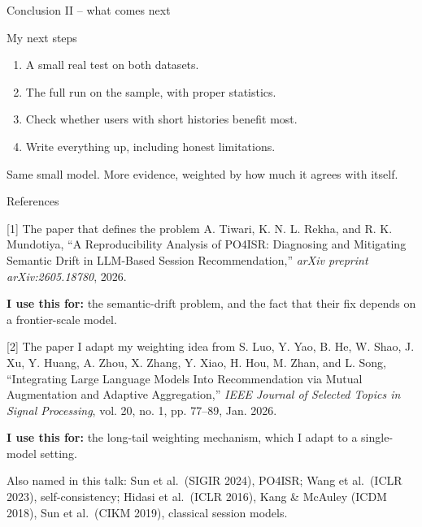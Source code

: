 \documentclass[aspectratio=169,12pt]{beamer}
\begin{document}
\begin{frame}{Conclusion II -- what comes next}
\begin{block}{My next steps}
\begin{enumerate}
  \item A small real test on both datasets.
  \item The full run on the sample, with proper statistics.
  \item Check whether users with short histories benefit most.
  \item Write everything up, including honest limitations.
\end{enumerate}
\end{block}

\vspace{1em}
\centering
\Large\textcolor{DeepBlue}{Same small model. More evidence, weighted by how much it agrees with itself.}
\end{frame}

\begin{frame}{References}
\small
\begin{block}{[1] The paper that defines the problem}
A. Tiwari, K. N. L. Rekha, and R. K. Mundotiya, ``A Reproducibility
Analysis of PO4ISR: Diagnosing and Mitigating Semantic Drift in LLM-Based
Session Recommendation,'' \emph{arXiv preprint arXiv:2605.18780}, 2026.
\vspace{0.2em}
\par\textcolor{Muted}{\footnotesize \textbf{I use this for:} the semantic-drift
problem, and the fact that their fix depends on a frontier-scale model.}
\end{block}

\vspace{0.4em}
\begin{block}{[2] The paper I adapt my weighting idea from}
S. Luo, Y. Yao, B. He, W. Shao, J. Xu, Y. Huang, A. Zhou, X. Zhang,
Y. Xiao, H. Hou, M. Zhan, and L. Song, ``Integrating Large Language Models
Into Recommendation via Mutual Augmentation and Adaptive Aggregation,''
\emph{IEEE Journal of Selected Topics in Signal Processing}, vol. 20,
no. 1, pp. 77--89, Jan. 2026.
\vspace{0.2em}
\par\textcolor{Muted}{\footnotesize \textbf{I use this for:} the long-tail
weighting mechanism, which I adapt to a single-model setting.}
\end{block}

\vspace{0.3em}
{\footnotesize\textcolor{Muted}{Also named in this talk: Sun et al.\ (SIGIR 2024),
PO4ISR; Wang et al.\ (ICLR 2023), self-consistency; Hidasi et al.\ (ICLR 2016),
Kang \& McAuley (ICDM 2018), Sun et al.\ (CIKM 2019), classical session models.}}
\end{frame}
\end{document}
